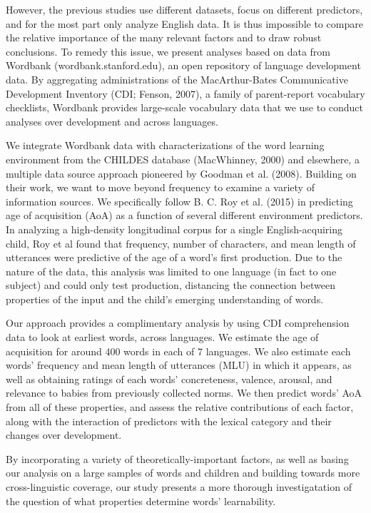 \documentclass[10pt, letterpaper]{article}
\begin{document}
However, the previous studies use different datasets, focus on different
predictors, and for the most part only analyze English data. It is thus
impossible to compare the relative importance of the many relevant
factors and to draw robust conclusions. To remedy this issue, we present
analyses based on data from Wordbank (wordbank.stanford.edu), an open
repository of language development data. By aggregating administrations
of the MacArthur-Bates Communicative Development Inventory (CDI; Fenson,
2007), a family of parent-report vocabulary checklists, Wordbank
provides large-scale vocabulary data that we use to conduct analyses
over development and across languages.

We integrate Wordbank data with characterizations of the word learning
environment from the CHILDES database (MacWhinney, 2000) and elsewhere,
a multiple data source approach pioneered by Goodman et al. (2008).
Building on their work, we want to move beyond frequency to examine a
variety of information sources. We specifically follow B. C. Roy et al.
(2015) in predicting age of acquisition (AoA) as a function of several
different environment predictors. In analyzing a high-density
longitudinal corpus for a single English-acquiring child, Roy et al
found that frequency, number of characters, and mean length of
utterances were predictive of the age of a word's first production. Due
to the nature of the data, this analysis was limited to one language (in
fact to one subject) and could only test production, distancing the
connection between properties of the input and the child's emerging
understanding of words.

Our approach provides a complimentary analysis by using CDI
comprehension data to look at earliest words, across languages. We
estimate the age of acquisition for around 400 words in each of 7
languages. We also estimate each words' frequency and mean length of
utterances (MLU) in which it appears, as well as obtaining ratings of
each words' concreteness, valence, arousal, and relevance to babies from
previously collected norms. We then predict words' AoA from all of these
properties, and assess the relative contributions of each factor, along
with the interaction of predictors with the lexical category and their
changes over development.

By incorporating a variety of theoretically-important factors, as well
as basing our analysis on a large samples of words and children and
building towards more cross-linguistic coverage, our study presents a
more thorough investigatation of the question of what properties
determine words' learnability.
\end{document}
